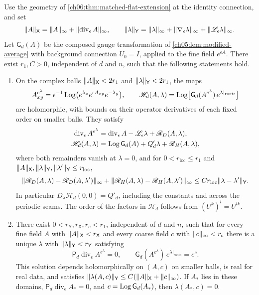 \begin{theorem}\label{ch06:thm:projected-landau-slice}
Use the geometry of \cref{ch06:thm:matched-flat-extension} at the identity connection, and set
\[
 \lVert A\rVert_{\mathsf X}=\lVert A\rVert_\infty+\lVert \operatorname{div}_\epsilon A\rVert_\infty,\qquad\lVert \lambda\rVert_{\mathsf Y}=\lVert \lambda\rVert_\infty+\lVert \nabla_\epsilon\lambda\rVert_\infty+\lVert \mathscr L_\epsilon\lambda\rVert_\infty.
\]
Let $\mathsf G_d(A)$ be the composed gauge transformation of \cref{ch05:lem:modified-average} with background connection $U_0=I$, applied to the fine field $e^{\epsilon A}$. There exist $r_1,C>0$, independent of $d$ and $n$, such that the following statements hold.
\begin{enumerate}
\item On the complex balls $\lVert A\rVert_{\mathsf X}<2r_1$ and $\lVert \lambda\rVert_{\mathsf Y}<2r_1$, the maps
\[
 A^{e^\lambda}_{xy}=\epsilon^{-1}\operatorname{Log}\bigl(e^{\lambda_x}e^{\epsilon A_{xy}}e^{-\lambda_y}\bigr),\qquad\mathscr H_d(A,\lambda)=\operatorname{Log}\bigl[\mathsf G_d(A^{e^\lambda})\,e^{\lambda|_{\mathrm{roots}}}\bigr]
\]
are holomorphic, with bounds on their operator derivatives of each fixed order on smaller balls. They satisfy
\[
 \begin{aligned}
 \operatorname{div}_\epsilon A^{e^\lambda}&=\operatorname{div}_\epsilon A-\mathscr L_\epsilon\lambda+\mathscr R_D(A,\lambda),\\
 \mathscr H_d(A,\lambda)&=\operatorname{Log}\mathsf G_d(A)+Q'_d\lambda+\mathscr R_H(A,\lambda),
 \end{aligned}
\]
where both remainders vanish at $\lambda=0$, and for $0<r_{\mathrm{loc}}\le r_1$ and $\lVert A\rVert_{\mathsf X},\lVert \lambda\rVert_{\mathsf Y},\lVert \lambda'\rVert_{\mathsf Y}\le r_{\mathrm{loc}}$,
\[
 \lVert \mathscr R_D(A,\lambda)-\mathscr R_D(A,\lambda')\rVert_\infty+\lVert \mathscr R_H(A,\lambda)-\mathscr R_H(A,\lambda')\rVert_\infty\le Cr_{\mathrm{loc}}\lVert \lambda-\lambda'\rVert_{\mathsf Y}.
\]
In particular $D_\lambda\mathscr H_d(0,0)=Q'_d$, including the constants and across the periodic seams. The order of the factors in $\mathscr H_d$ follows from $(U^k)^l=U^{lk}$.
\item There exist $0<r_{\mathsf Y},r_{\mathsf X},r_c<r_1$, independent of $d$ and $n$, such that for every fine field $A$ with $\lVert A\rVert_{\mathsf X}<r_{\mathsf X}$ and every coarse field $c$ with $\lVert c\rVert_\infty<r_c$ there is a unique $\lambda$ with $\lVert \lambda\rVert_{\mathsf Y}<r_{\mathsf Y}$ satisfying
\[
 \mathsf P_d\operatorname{div}_\epsilon A^{e^\lambda}=0,\qquad\mathsf G_d(A^{e^\lambda})\,e^{\lambda|_{\mathrm{roots}}}=e^c.
\]
This solution depends holomorphically on $(A,c)$ on smaller balls, is real for real data, and satisfies $\lVert \lambda(A,c)\rVert_{\mathsf Y}\le C(\lVert A\rVert_{\mathsf X}+\lVert c\rVert_\infty)$. If $A_*$ lies in these domains, $\mathsf P_d\operatorname{div}_\epsilon A_*=0$, and $c=\operatorname{Log}\mathsf G_d(A_*)$, then $\lambda(A_*,c)=0$.

\end{enumerate}
\end{theorem}
